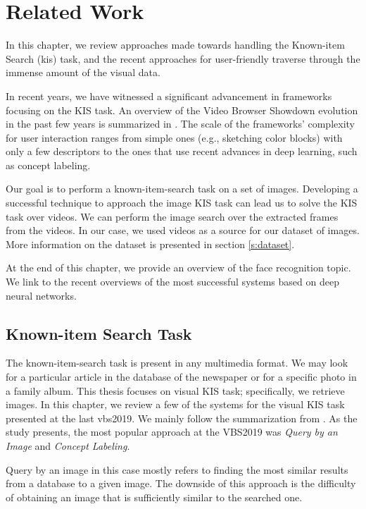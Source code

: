 \chapter{Related Work}
\label{ch:related_work}


In this chapter, we review approaches made towards handling the Known-item Search (\acrshort{kis}) task, and the recent approaches for user-friendly traverse through the immense amount of the visual data.

In recent years, we have witnessed a significant advancement in frameworks focusing on the KIS task. An overview of the Video Browser Showdown evolution in the past few years is summarized in \citep{lokovc2018influential}. The scale of the frameworks' complexity for user interaction ranges from simple ones (e.g., sketching color blocks) with only a few descriptors to the ones that use recent advances in deep learning, such as concept labeling.

Our goal is to perform a known-item-search task on a set of images. Developing a successful technique to approach the image KIS task can lead us to solve the KIS task over videos. We can perform the image search over the extracted frames from the videos. In our case, we used videos as a source for our dataset of images. More information on the dataset is presented in section \ref{s:dataset}.

At the end of this chapter, we provide an overview of the face recognition topic. We link to the recent overviews of the most successful systems based on deep neural networks.

\section{Known-item Search Task}

The known-item-search task is present in any multimedia format. We may look for a particular article in the database of the newspaper or for a specific photo in a family album. This thesis focuses on visual KIS task; specifically, we retrieve images. In this chapter, we review a few of the systems for the visual KIS task presented at the last \acrshort{vbs}2019. We mainly follow the summarization from \cite{rossetto2020interactive}. As the study presents, the most popular approach at the VBS2019 was \emph{Query by an Image} and \emph{Concept Labeling}. 

Query by an image in this case mostly refers to finding the most similar results from a database to a given image. The downside of this approach is the difficulty of obtaining an image that is sufficiently similar to the searched one.

